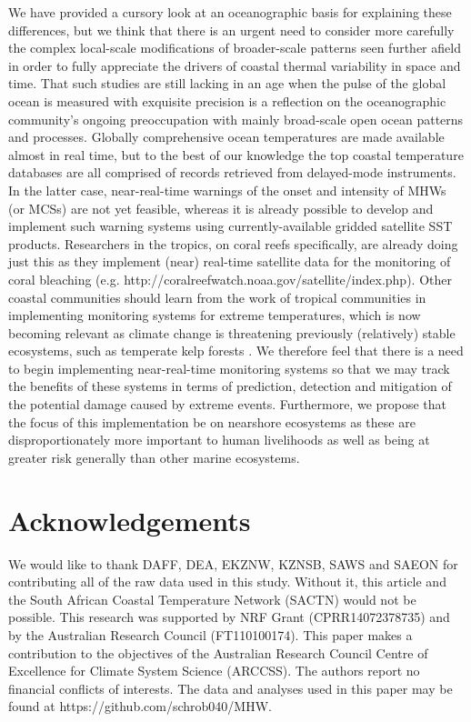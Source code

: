 \documentclass[a4paper,10pt,review]{elsarticle}
\begin{document}
We have provided a cursory look at an oceanographic basis for explaining these differences, but we think that there is an urgent need to consider more carefully the complex local-scale modifications of broader-scale patterns seen further afield in order to fully appreciate the drivers of coastal thermal variability in space and time. That such studies are still lacking in an age when the pulse of the global ocean is measured with exquisite precision is a reflection on the oceanographic community's ongoing preoccupation with mainly broad-scale open ocean patterns and processes. Globally comprehensive ocean temperatures are made available almost in real time, but to the best of our knowledge the top coastal temperature databases are all comprised of records retrieved from delayed-mode instruments. In the latter case, near-real-time warnings of the onset and intensity of MHWs (or MCSs) are not yet feasible, whereas it is already possible to develop and implement such warning systems using currently-available gridded satellite SST products. Researchers in the tropics, on coral reefs specifically, are already doing just this as they implement (near) real-time satellite data for the monitoring of coral bleaching (e.g. http://coralreefwatch.noaa.gov/satellite/index.php). Other coastal communities should learn from the work of tropical communities in implementing monitoring systems for extreme temperatures, which is now becoming relevant as climate change is threatening previously (relatively) stable ecosystems, such as temperate kelp forests \citep{Wernberg2016}. We therefore feel that there is a need to begin implementing near-real-time monitoring systems so that we may track the benefits of these systems in terms of prediction, detection and mitigation of the potential damage caused by extreme events. Furthermore, we propose that the focus of this implementation be on nearshore ecosystems as these are disproportionately more important to human livelihoods as well as being at greater risk generally than other marine ecosystems.

\section*{Acknowledgements}
We would like to thank DAFF, DEA, EKZNW, KZNSB, SAWS and SAEON for contributing all of the raw data used in this study. Without it, this article and the South African Coastal Temperature Network (SACTN) would not be possible. This research was supported by NRF Grant (CPRR14072378735) and by the Australian Research Council (FT110100174). This paper makes a contribution to the objectives of the Australian Research Council Centre of Excellence for Climate System Science (ARCCSS). The authors report no financial conflicts of interests. The data and analyses used in this paper may be found at https://github.com/schrob040/MHW.
\end{document}
